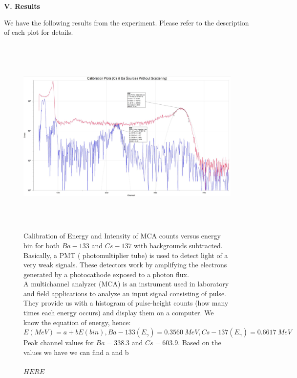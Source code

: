 \documentclass[fleqn]{article}
\begin{document}
  \textbf{V. Results}

  \vspace{10px}

  We have the following results from the experiment. Please refer to the description of each plot for details.

  \begin{figure}[htbp]
    \includegraphics[height=10cm, width=18cm]{Three.JPG}
    \caption{
      Calibration of Energy and Intensity of MCA counts versus energy
      bin for both $Ba-133$ and $Cs-137$ with backgrounds subtracted. Basically, a PMT ( photomultiplier tube)
      is used to detect light of a very weak signals. These detectors work by amplifying the electrons generated by a photocathode 
      exposed to a photon flux. 
      \\
      A multichannel analyzer (MCA) is an instrument used in laboratory and field applications to analyze an input signal consisting of pulse.
      They provide us with a histogram of pulse-height counts (how many times each energy
      occurs) and display them on a computer. We know the equation of energy, hence:
      \\
      $
        E(MeV)=a+bE(bin), Ba-133(E_\gamma)=0.3560 ~ MeV, Cs-137(E_\gamma)=0.6617 ~ MeV
      $
      \\
      Peak channel values for $Ba=338.3$ and $Cs=603.9$. Based on the values we have we can find a and b
      \\
      \\
      $
        HERE
      $
     }
  \end{figure}
\end{document}
